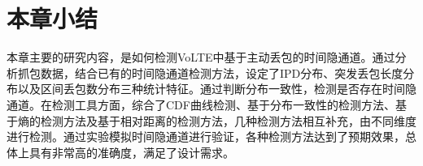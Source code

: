 \section{本章小结}
\label{chap:analyze:summary}

本章主要的研究内容，是如何检测VoLTE中基于主动丢包的时间隐通道。通过分析抓包数据，结合已有的时间隐通道检测方法，设定了IPD分布、突发丢包长度分布以及区间丢包数分布三种统计特征。通过判断分布一致性，检测是否存在时间隐通道。在检测工具方面，综合了CDF曲线检测、基于分布一致性的检测方法、基于熵的检测方法及基于相对距离的检测方法，几种检测方法相互补充，由不同维度进行检测。通过实验模拟时间隐通道进行验证，各种检测方法达到了预期效果，总体上具有非常高的准确度，满足了设计需求。
